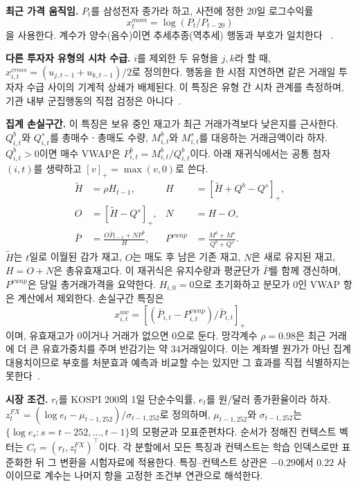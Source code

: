 \textbf{최근 가격 움직임.}
$P_t$를 삼성전자 종가라 하고, 사전에 정한 20일 로그수익률
\[
x^{mom}_{t}=\log(P_t/P_{t-20})
\]
을 사용한다. 계수가 양수(음수)이면 추세추종(역추세) 행동과 부호가 일치한다
~\cite{grinblatt2000investment,choe1999foreign}.

\textbf{다른 투자자 유형의 시차 수급.}
$i$를 제외한 두 유형을 $j,k$라 할 때,
$x^{cross}_{i,t}=(u_{j,t-1}+u_{k,t-1})/2$로 정의한다. 행동을 한 시점 지연하면 같은
거래일 투자자 수급 사이의 기계적 상쇄가 배제된다. 이 특징은 유형 간 시차 관계를
측정하며, 기관 내부 군집행동의 직접 검정은 아니다~\cite{lakonishok1992impact}.

\textbf{집계 손실구간.}
이 특징은 보유 중인 재고가 최근 거래가격보다 낮은지를 근사한다.
$Q^b_{i,t}$와 $Q^s_{i,t}$를 총매수ㆍ총매도 수량, $M^b_{i,t}$와 $M^s_{i,t}$를 대응하는
거래금액이라 하자. $Q^b_{i,t}>0$이면 매수 VWAP은
$P^b_{i,t}=M^b_{i,t}/Q^b_{i,t}$이다. 아래 재귀식에서는 공통 첨자 $(i,t)$를 생략하고
$[v]_+=\max(v,0)$로 쓴다.
\begin{equation}
\begin{aligned}
\widetilde H&=\rho H_{t-1}, & H&=[\widetilde H+Q^b-Q^s]_+,\\
O&=[\widetilde H-Q^s]_+, & N&=H-O,\\
\bar P&=\frac{O\bar P_{t-1}+NP^b}{H},&
P^{vwap}&=\frac{M^b+M^s}{Q^b+Q^s}.
\end{aligned}
\label{eq:cost}
\end{equation}
$\widetilde H$는 $t$일로 이월된 감가 재고, $O$는 매도 후 남은 기존 재고, $N$은 새로
유지된 재고, $H=O+N$은 총유효재고다. 이 재귀식은 유지수량과 평균단가 $\bar P$를 함께
갱신하며, $P^{vwap}$은 당일 총거래가격을 요약한다. $H_{i,0}=0$으로 초기화하고 분모가
0인 VWAP 항은 계산에서 제외한다. 손실구간 특징은
\[
x^{uw}_{i,t}=\left[(\bar P_{i,t}-P^{vwap}_{i,t})/\bar P_{i,t}\right]_+
\]
이며, 유효재고가 0이거나 거래가 없으면 0으로 둔다. 망각계수 $\rho=0.98$은 최근 거래에
더 큰 유효가중치를 주며 반감기는 약 34거래일이다. 이는 계좌별 원가가 아닌 집계
대용치이므로 부호를 처분효과 예측과 비교할 수는 있지만 그 효과를 직접 식별하지는
못한다~\cite{shefrin1985disposition,odean1998investors}.

\textbf{시장 조건.}
$r_t$를 KOSPI 200의 1일 단순수익률, $e_t$를 원/달러 종가환율이라 하자.
$z^{FX}_t=(\log e_t-\mu_{t-1,252})/\sigma_{t-1,252}$로 정의하며,
$\mu_{t-1,252}$와 $\sigma_{t-1,252}$는
$\{\log e_s:s=t-252,\ldots,t-1\}$의 모평균과 모표준편차다. 순서가 정해진 컨텍스트
벡터는 $C_t=(r_t,z^{FX}_t)^\top$이다. 각 분할에서 모든 특징과 컨텍스트는 학습
인덱스로만 표준화한 뒤 그 변환을 시험자료에 적용한다. 특징--컨텍스트 상관은
$-0.29$에서 $0.22$ 사이이므로 계수는 나머지 항을 고정한 조건부 연관으로 해석한다.

